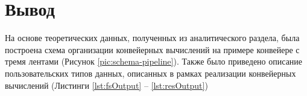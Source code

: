 \section{Вывод}
На основе теоретических данных, полученных из аналитического раздела, была построена схема
организации конвейерных вычислений на примере конвейере с тремя лентами (Рисунок \ref{pic:schema-pipeline}).
Также было приведено описание пользовательских типов данных, описанных в рамках
реализации конвейерных вычислений (Листинги \ref{lst:fsOutput} -- \ref{lst:resOutput})